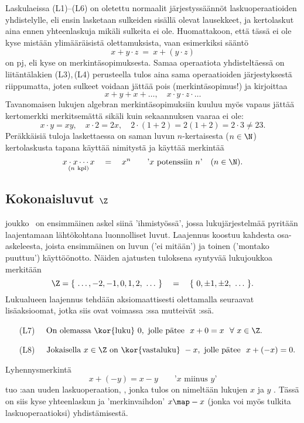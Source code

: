 Laskulaeissa (L1)--(L6) on oletettu normaalit järjestyssäännöt laskuoperaatioiden yhdistelylle,
eli ensin lasketaan sulkeiden sisällä olevat lausekkeet, ja kertolaskut aina ennen yhteenlaskuja
mikäli sulkeita ei ole. Huomattakoon, että tässä ei ole kyse mistään ylimääräisistä 
olettamuksista, vaan esimerkiksi sääntö
\[
x + y \cdot z\ =\ x + (y \cdot z)
\]
on  pj, eli kyse on merkintäsopimuksesta. Samaa
operaatiota yhdisteltäessä on  liitäntälakien (L3),\,(L4) perusteella tulos aina sama
operaatioiden järjestyksestä riippumatta, joten sulkeet voidaan jättää pois (merkintäsopimus!)
ja kirjoittaa
\[
x + y + x + \ldots, \quad x \cdot y \cdot z \cdot \ldots
\]
Tavanomaisen lukujen algebran merkintäsopimuksiin kuuluu myös vapaus jättää kertomerkki
merkitsemättä sikäli kuin sekaannuksen vaaraa ei ole:
\[
x \cdot y = xy, \quad x \cdot 2 = 2x, \quad  2\cdot(1+2) = 2(1+2) = 2 \cdot 3 \neq 23.
\]
Peräkkäisiä tuloja laskettaessa on saman luvun $n$-kertaisesta ($n \in \N$) kertolaskusta tapana
käyttää nimitystä  ja käyttää merkintää
\[
\underset{(n\ \text{kpl})}{x \cdot x \cdots x} \quad = \quad x^n \quad 
                              \quad \text{'$x$ potenssiin $n$'} \quad (n \in \N).
\]
   
\subsection*{Kokonaisluvut $\Z$}
%

 joukko \Z\ on ensimmäinen askel siinä 'ihmistyössä', jossa 
lukujärjestelmää pyritään laajentamaan lähtökohtana luonnolliset luvut. Laajennus koostuu 
kahdesta osa-askeleesta, joista ensimmäinen on luvun  ('ei mitään') ja toinen 
 ('montako puuttuu') käyttöönotto. Näiden ajatusten tuloksena syntyvää 
lukujoukkoa merkitään
\[
\Z = \{\ \ldots,-2,-1,0,1,2,\ \ldots\ \} \quad = \quad \{\ 0,\pm 1, \pm 2,\ \ldots\ \}.
\]
Lukualueen laajennus tehdään aksiomaattisesti olettamalla seuraavat lisäaksioomat, jotka siis
ovat voimassa \Z:ssa mutteivät \N:ssä.
\begin{itemize}
\item[(L7)] $\quad \text{On olemassa \kor{luku}}\ 0,\ 
                   \text{jolle pätee}\ \ x+0 = x\ \ \forall\ x \in \Z.$
\item[(L8)] $\quad \text{Jokaisella}\ x \in \Z\ \text{on \kor{vastaluku}}\ -x,\ 
                   \text{jolle pätee}\ \ x+(-x) = 0.$
\end{itemize}
Lyhennysmerkintä
\[
x + (-y) = x - y \quad \quad \text{'$x$ miinus $y$'}
\]
tuo \Z:aan uuden laskuoperaation, , jonka tulos on nimeltään lukujen $x$ ja
$y$ .  Tässä on siis kyse yhteenlaskun ja 'merkinvaihdon' $x \map -x$ (jonka voi 
myös tulkita laskuoperaatioksi) yhdistämisestä.

